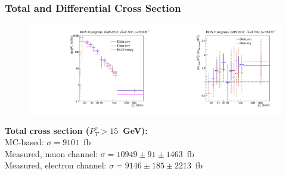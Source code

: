 \begin{frame}\frametitle{Total and Differential Cross Section}
\begin{figure}[htb]
  \begin{center}
   \includegraphics[width=0.5\textwidth]{../figs/figs_v11/ChannelsMERGED_WGamma/CrossSection/compareCSWGamma.pdf}\includegraphics[width=0.5\textwidth]{../figs/figs_v11/ChannelsMERGED_WGamma/CrossSection/compareCSratioTheoryWGamma.pdf}\\
  \end{center}
\end{figure}
\scriptsize
{\bfseries{Total cross section ($P_T^{\gamma}>15$~GeV):}}\\
MC-based: $\sigma=9101$~fb\\
Measured, muon channel:   $\sigma = 10949 \pm 91 \pm 1463$~fb\\
Measured, electron channel:   $\sigma = 9146 \pm 185 \pm 2213$~fb\\
\end{frame}%


